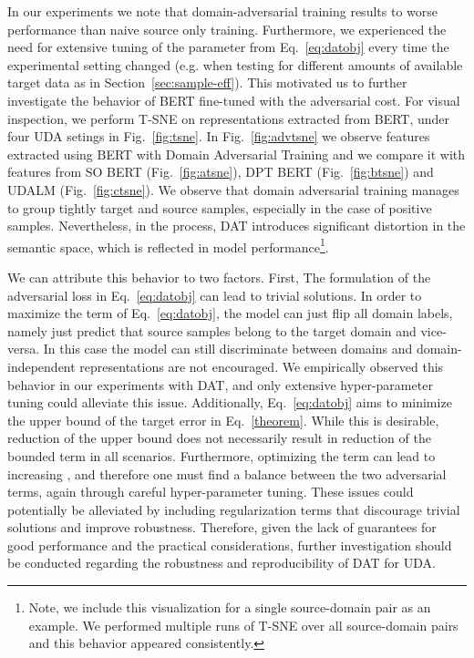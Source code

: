 \documentclass[11pt]{article}
\begin{document}
In our experiments we note that domain-adversarial training results to worse performance than naive source only training. Furthermore, we experienced the need for extensive tuning of the  parameter from Eq.~\ref{eq:datobj} every time the experimental setting changed (e.g. when testing for different amounts of available target data as in Section~\ref{sec:sample-eff}). This motivated us to further investigate the behavior of BERT fine-tuned with the adversarial cost.
For visual inspection, we perform T-SNE \citep{maaten2008visualizing} on representations extracted from BERT, under four UDA setings in Fig.~\ref{fig:tsne}. 
In Fig.~\ref{fig:advtsne} we observe features extracted using BERT with Domain Adversarial Training and we compare it with features from SO BERT (Fig.~\ref{fig:atsne}), DPT BERT (Fig.~\ref{fig:btsne}) and UDALM (Fig.~\ref{fig:ctsne}).
We observe that domain adversarial training manages to group tightly target and source samples, especially in the case of positive samples. Nevertheless, in the process, DAT introduces significant distortion in the semantic space, which is reflected in model performance\footnote{Note, we include this visualization for a single source-domain pair as an example. We performed multiple runs of T-SNE over all  source-domain pairs and this behavior appeared consistently.}.

We can attribute this behavior to two factors. First, The formulation of the adversarial loss in Eq.~\eqref{eq:datobj} can lead to trivial solutions. In order to maximize the  term of  Eq.~\eqref{eq:datobj}, the model can just flip all domain labels, namely just predict that source samples belong to the target domain and vice-versa. In this case the model can still discriminate between domains and domain-independent representations are not encouraged. We empirically observed this behavior in our experiments with DAT, and only extensive hyper-parameter tuning could alleviate this issue.
Additionally, Eq.~\eqref{eq:datobj} aims to minimize the upper bound of the target error  in Eq.~\eqref{theorem}. While this is desirable, reduction of the upper bound does not necessarily result in reduction of the bounded term in all scenarios.  
Furthermore, optimizing the  term can lead to increasing , and therefore one must find a balance between the two adversarial terms, again through careful hyper-parameter tuning.
These issues could potentially be alleviated by including regularization terms that discourage trivial solutions and improve robustness.
Therefore, given the lack of guarantees for good performance and the practical considerations, further investigation should be conducted regarding the robustness and reproducibility of DAT for UDA.
\end{document}
